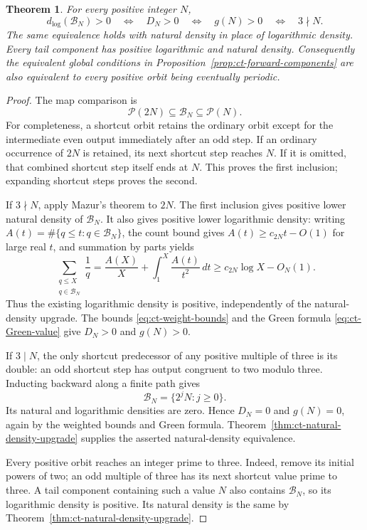 \documentclass[11pt,a4paper]{article}
\newtheorem{theorem}{Theorem}
\begin{document}
\begin{theorem}\label{thm:ct-positive-unit-support}
For every positive integer \(N\),
\[
 d_{\log}(\mathcal B_N)>0
 \quad\Longleftrightarrow\quad D_N>0
 \quad\Longleftrightarrow\quad g(N)>0
 \quad\Longleftrightarrow\quad 3\nmid N.
\]
The same equivalence holds with natural density in place of
logarithmic density. Every tail component has positive logarithmic
and natural density. Consequently the equivalent global conditions
in Proposition~\ref{prop:ct-forward-components} are also equivalent
to every positive orbit being eventually periodic.
\end{theorem}
\begin{proof}
The map comparison
\cite[equation~(1.3)]{MazurPredecessors2026} is
\[
 \mathcal P(2N)\subseteq\mathcal B_N\subseteq\mathcal P(N).
\]
For completeness, a shortcut orbit retains the ordinary orbit
except for the intermediate even output immediately after an odd
step. If an ordinary occurrence of \(2N\) is retained, its next
shortcut step reaches \(N\). If it is omitted, that combined
shortcut step itself ends at \(N\). This proves the first
inclusion; expanding shortcut steps proves the second.

If \(3\nmid N\), apply Mazur's theorem to \(2N\). The first
inclusion gives positive lower natural density of \(\mathcal B_N\).
It also gives positive lower logarithmic density: writing
\(A(t)=\#\{q\le t:q\in\mathcal B_N\}\), the count bound
gives \(A(t)\ge c_{2N}t-O(1)\) for large real \(t\), and
summation by parts yields
\[
 \sum_{\substack{q\le X\\q\in\mathcal B_N}}\frac1q
 =\frac{A(X)}X+\int_1^X\frac{A(t)}{t^2}\,dt
 \ge c_{2N}\log X-O_N(1).
\]
Thus the existing logarithmic density is positive, independently
of the natural-density upgrade. The bounds
\eqref{eq:ct-weight-bounds} and the Green formula
\eqref{eq:ct-Green-value} give \(D_N>0\) and \(g(N)>0\).

If \(3\mid N\), the only shortcut predecessor of any positive
multiple of three is its double: an odd shortcut step has output
congruent to two modulo three. Inducting backward along a finite
path gives
\[
 \mathcal B_N=\{2^jN:j\ge0\}.
\]
Its natural and logarithmic densities are zero. Hence \(D_N=0\)
and \(g(N)=0\), again by the weighted bounds and Green formula.
Theorem~\ref{thm:ct-natural-density-upgrade} supplies the asserted
natural-density equivalence.

Every positive orbit reaches an integer prime to three. Indeed,
remove its initial powers of two; an odd multiple of three has
its next shortcut value prime to three. A tail component containing
such a value \(N\) also contains \(\mathcal B_N\), so its
logarithmic density is positive. Its natural density is the same
by Theorem~\ref{thm:ct-natural-density-upgrade}.


\end{proof}
\end{document}
